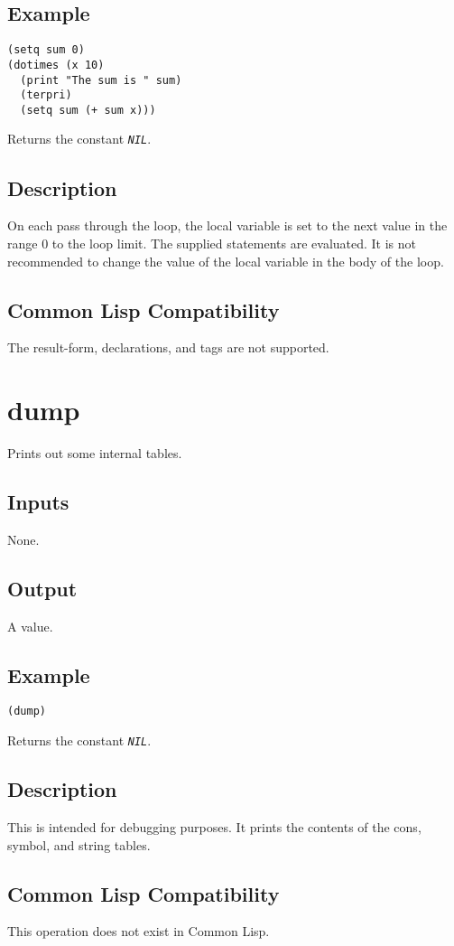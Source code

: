 \documentclass[10pt, openany]{book}
\newcommand{\constant}[1]{\emph{\texttt{#1}}}
\newcommand{\cl}{Common Lisp}
\begin{document}
\subsection{Example}
\begin{lstlisting}
(setq sum 0)
(dotimes (x 10)
  (print "The sum is " sum)
  (terpri)
  (setq sum (+ sum x)))
\end{lstlisting}
Returns the constant \constant{NIL}.
\subsection{Description}
On each pass through the loop, the local variable is set to the next value in the range 0 to the loop limit.  The supplied statements are evaluated.  It is not recommended to change the value of the local variable in the body of the loop.
\subsection{Common Lisp Compatibility}
The result-form, declarations, and tags are not supported.

\section{dump}
Prints out some internal tables.
\subsection{Inputs}
None.
\subsection{Output}
A value.
\subsection{Example}
\begin{lstlisting}
(dump)
\end{lstlisting}
Returns the constant \constant{NIL}.
\subsection{Description}
This is intended for debugging purposes.  It prints the contents of the cons, symbol, and string tables.
\subsection{Common Lisp Compatibility}
This operation does not exist in \cl.
\end{document}
